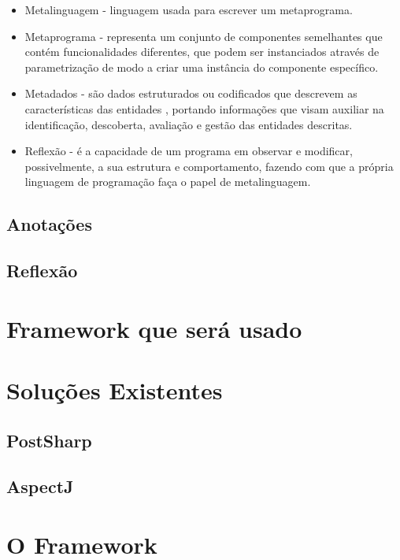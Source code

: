 \documentclass[tc,openright]{iiufrgs}
\begin{document}
\begin{itemize}
\item Metalinguagem - linguagem usada para escrever um metaprograma.
\item Metaprograma - representa um conjunto de componentes semelhantes que contém funcionalidades diferentes, que podem ser instanciados através de parametrização de modo a criar uma instância do componente específico. \cite{damavsevivcius2008taxonomy}
\item Metadados - são dados estruturados ou codificados que descrevem as características das entidades , portando informações que visam auxiliar na identificação,  descoberta, avaliação e gestão das entidades descritas.\cite{american1999task}
\item Reflexão - é a capacidade de um programa em observar e modificar, possivelmente, a sua estrutura e comportamento, fazendo com que a própria linguagem de programação faça o papel de metalinguagem.\cite{malenfant1996tutorial}
\end{itemize}

\section{Anotações}

\section{Reflexão}

\chapter{Framework que será usado}

\chapter{Soluções Existentes}

\section{PostSharp}

\section{AspectJ}

\chapter{O Framework}
\end{document}
